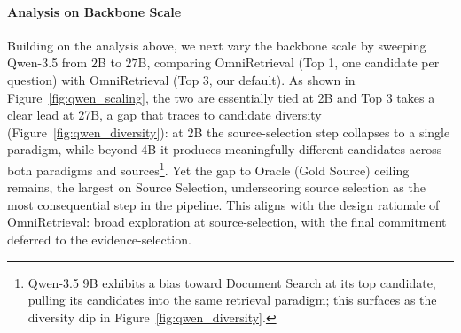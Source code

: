 \documentclass{llmxive}
\begin{document}
\paragraph{Analysis on Backbone Scale}
Building on the analysis above, we next vary the backbone scale by sweeping Qwen-3.5 from $2$B to $27$B, comparing OmniRetrieval (Top 1, one candidate per question) with OmniRetrieval (Top 3, our default). As shown in Figure~\ref{fig:qwen_scaling}, the two are essentially tied at 2B and Top 3 takes a clear lead at 27B, a gap that traces to candidate diversity (Figure~\ref{fig:qwen_diversity}): at 2B the source-selection step collapses to a single paradigm, while beyond 4B it produces meaningfully different candidates across both paradigms and sources\footnote{Qwen-3.5 9B exhibits a bias toward Document Search at its top candidate, pulling its candidates into the same retrieval paradigm; this surfaces as the diversity dip in Figure~\ref{fig:qwen_diversity}.}. Yet the gap to Oracle (Gold Source) ceiling remains, the largest on Source Selection, underscoring source selection as the most consequential step in the pipeline. This aligns with the design rationale of OmniRetrieval: broad exploration at source-selection, with the final commitment deferred to the evidence-selection.
\end{document}
